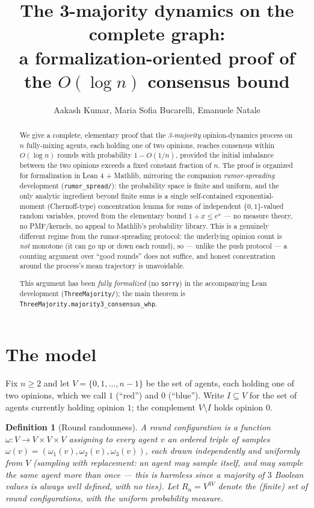 \documentclass[11pt]{article}
\title{The 3-majority dynamics on the complete graph:\\
a formalization-oriented proof of the $O(\log n)$ consensus bound}
\author{Aakash Kumar, Maria Sofia Bucarelli, Emanuele Natale}
\date{}
\newtheorem{definition}[theorem]{Definition}
\begin{document}
\maketitle

\begin{abstract}
\noindent
We give a complete, elementary proof that the \emph{3-majority} opinion-dynamics
process on $n$ fully-mixing agents, each holding one of two opinions, reaches
consensus within $O(\log n)$ rounds with probability $1 - O(1/n)$, provided the
initial imbalance between the two opinions exceeds a fixed constant fraction of
$n$. The proof is organized for formalization in Lean 4 + Mathlib, mirroring
the companion \emph{rumor-spreading} development (\texttt{rumor\_spread/}):
the probability space is finite and uniform, and the only analytic ingredient
beyond finite sums is a single self-contained exponential-moment
(Chernoff-type) concentration lemma for sums of independent $\{0,1\}$-valued
random variables, proved from the elementary bound $1+x \le e^x$ — no
measure theory, no PMF/kernels, no appeal to Mathlib's probability library.
This is a genuinely different regime from the rumor-spreading protocol: the
underlying opinion count is \emph{not} monotone (it can go up or down each
round), so — unlike the push protocol — a counting argument over ``good
rounds'' does not suffice, and honest concentration around the process's
mean trajectory is unavoidable.

\smallskip
\noindent
This argument has been \emph{fully formalized} (no \texttt{sorry}) in the
accompanying Lean development (\texttt{ThreeMajority/}); the main theorem is
\texttt{ThreeMajority.majority3\_consensus\_whp}.
\end{abstract}

\section{The model}\label{sec:model}

Fix $n \ge 2$ and let $V = \{0,1,\dots,n-1\}$ be the set of agents, each
holding one of two opinions, which we call $1$ (``red'') and $0$
(``blue''). Write $I \subseteq V$ for the set of agents currently holding
opinion $1$; the complement $V \setminus I$ holds opinion $0$.

\begin{definition}[Round randomness]\label{def:round}
A \emph{round configuration} is a function $\omega \colon V \to V \times V
\times V$ assigning to every agent $v$ an ordered triple of \emph{samples}
$\omega(v) = (\omega_1(v), \omega_2(v), \omega_3(v))$, each drawn
independently and uniformly from $V$ (sampling \emph{with} replacement: an
agent may sample itself, and may sample the same agent more than once — this
is harmless since a majority of $3$ Boolean values is always well defined,
with no ties). Let $R_n = V^{3V}$ denote the (finite) set of round
configurations, with the uniform probability measure.
\end{definition}
\end{document}
